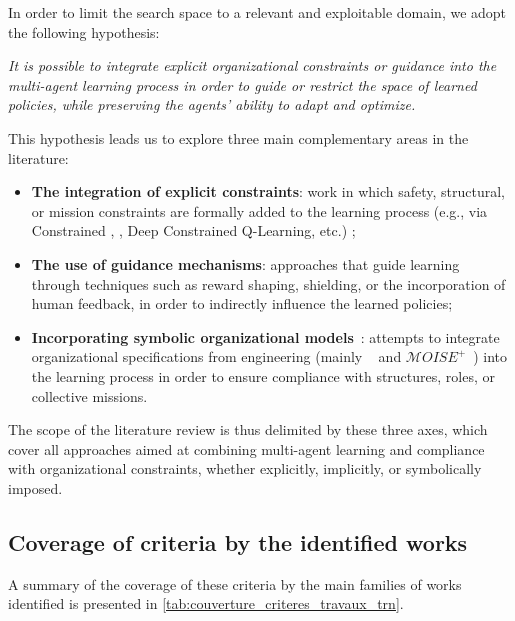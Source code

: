 In order to limit the search space to a relevant and exploitable domain, we adopt the following hypothesis:

\textit{It is possible to integrate explicit organizational constraints or guidance into the multi-agent learning process in order to guide or restrict the space of learned policies, while preserving the agents' ability to adapt and optimize.}

This hypothesis leads us to explore three main complementary areas in the literature:
\begin{itemize}
  \item \textbf{The integration of explicit constraints}: work in which safety, structural, or mission constraints are formally added to the learning process (e.g., via Constrained , , Deep Constrained Q-Learning, etc.) ;
  \item \textbf{The use of guidance mechanisms}: approaches that guide learning through techniques such as reward shaping, shielding, or the incorporation of human feedback, in order to indirectly influence the learned policies;
  \item \textbf{Incorporating symbolic organizational models}~: attempts to integrate organizational specifications from  engineering (mainly ~\cite{Ferber2004} and $\mathcal{M} OISE^+$~\cite{hubner2002moise}) into the learning process in order to ensure compliance with structures, roles, or collective missions.
\end{itemize}

The scope of the literature review is thus delimited by these three axes, which cover all approaches aimed at combining multi-agent learning and compliance with organizational constraints, whether explicitly, implicitly, or symbolically imposed.

\subsection*{Coverage of criteria by the identified works}

A summary of the coverage of these criteria by the main families of works identified is presented in \autoref{tab:couverture_criteres_travaux_trn}.

